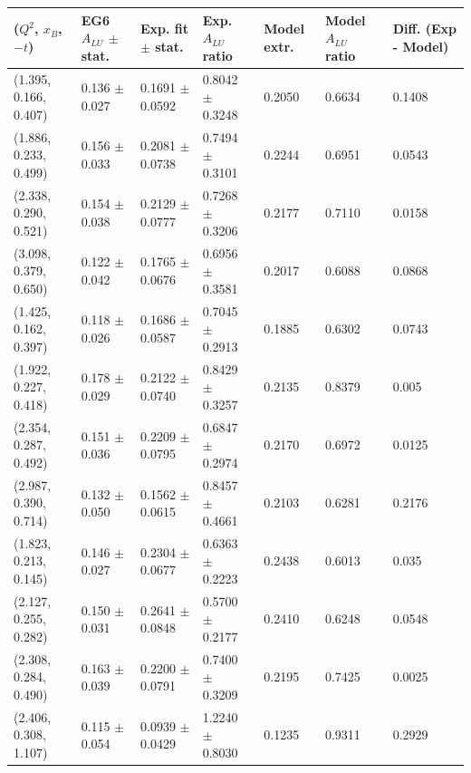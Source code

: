 \begin{landscape}
\begin{table}[!h]
   \begin{center}
      \begin{tabular}{||l|l|l|l|l|l|l||}
         \hline
 ($Q^{2}$, $x_{B}$, $-t$) & EG6 $A_{LU}$ $\pm$ stat. &  Exp. fit $\pm$ stat. & Exp. $A_{LU}$ ratio   &  Model extr. & Model $A_{LU}$ ratio &  Diff. (Exp - Model)    \\
  \hline
(1.395, 0.166, 0.407) &  0.136 $\pm$ 0.027   &    0.1691 $\pm$ 0.0592   &  0.8042 $\pm$ 0.3248  &  0.2050 &  0.6634 &  0.1408 \\
(1.886, 0.233, 0.499) &  0.156 $\pm$ 0.033   &    0.2081 $\pm$ 0.0738   &  0.7494 $\pm$ 0.3101  &  0.2244 &  0.6951 &  0.0543 \\ 
(2.338, 0.290, 0.521) &  0.154 $\pm$ 0.038   &    0.2129 $\pm$ 0.0777   &  0.7268 $\pm$ 0.3206  &  0.2177 &  0.7110 &  0.0158 \\
(3.098, 0.379, 0.650) &  0.122 $\pm$ 0.042   &    0.1765 $\pm$ 0.0676   &  0.6956 $\pm$ 0.3581  &  0.2017 &  0.6088 &  0.0868 \\
  \hline \hline  \hline                                                                                                
(1.425, 0.162, 0.397) &  0.118 $\pm$ 0.026   &    0.1686 $\pm$ 0.0587   &  0.7045 $\pm$ 0.2913  &  0.1885 &  0.6302 &  0.0743 \\
(1.922, 0.227, 0.418) &  0.178 $\pm$ 0.029   &    0.2122 $\pm$ 0.0740   &  0.8429 $\pm$ 0.3257  &  0.2135 &  0.8379 &  0.005  \\
(2.354, 0.287, 0.492) &  0.151 $\pm$ 0.036   &    0.2209 $\pm$ 0.0795   &  0.6847 $\pm$ 0.2974  &  0.2170 &  0.6972 &  0.0125 \\
(2.987, 0.390, 0.714) &  0.132 $\pm$ 0.050   &    0.1562 $\pm$ 0.0615   &  0.8457 $\pm$ 0.4661  &  0.2103 &  0.6281 &  0.2176 \\
  \hline  \hline  \hline                                                                                               
(1.823, 0.213, 0.145) &  0.146 $\pm$ 0.027   &    0.2304 $\pm$ 0.0677   &  0.6363 $\pm$ 0.2223  &  0.2438 &  0.6013 &  0.035  \\
(2.127, 0.255, 0.282) &  0.150 $\pm$ 0.031   &    0.2641 $\pm$ 0.0848   &  0.5700 $\pm$ 0.2177  &  0.2410 &  0.6248 &  0.0548 \\
(2.308, 0.284, 0.490) &  0.163 $\pm$ 0.039   &    0.2200 $\pm$ 0.0791   &  0.7400 $\pm$ 0.3209  &  0.2195 &  0.7425 &  0.0025 \\
(2.406, 0.308, 1.107) &  0.115 $\pm$ 0.054   &    0.0939 $\pm$ 0.0429   &  1.2240 $\pm$ 0.8030  &  0.1235 &  0.9311 &  0.2929 \\

\end{tabular}
\end{center}
\end{table}
\end{landscape}
